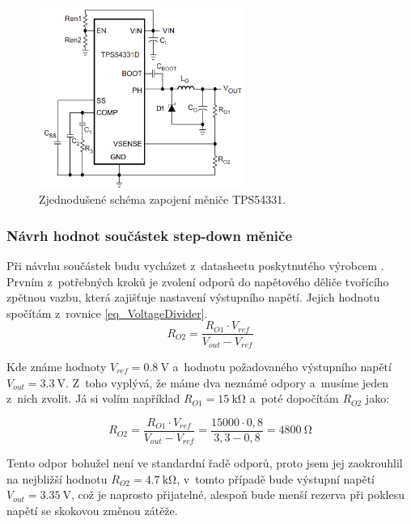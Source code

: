 \begin{figure}
    \centering
    \includegraphics[width=0.6\textwidth]{obrazky/schematicTPS54331.png}
    \caption{Zjednodušené schéma zapojení měniče TPS54331.\cite{dat_TPS54331}}
    \label{fig_Schematic-TPS54331}
\end{figure}

\subsubsection{Návrh hodnot součástek step-down měniče}

Při návrhu součástek budu vycházet z~datasheetu poskytnutého výrobcem \cite{dat_TPS54331}. Prvním z~potřebných kroků je zvolení odporů do napětového děliče tvořícího zpětnou vazbu, která zajišťuje nastavení výstupního napětí. Jejich hodnotu spočítám z~rovnice \ref{eq_VoltageDivider}.
\begin{equation}
    R_{O2}=\frac{R_{O1}\cdot V_{ref}}{V_{out}-V_{ref}}
    \label{eq_VoltageDivider}
\end{equation}

Kde známe hodnoty $V_{ref} = \SI{0,8}{\volt}$ a~hodnotu požadovaného výstupního napětí $V_{out} = \SI{3,3}{\volt}$. Z~toho vyplývá, že máme dva neznámé odpory a~musíme jeden z~nich zvolit. Já si volím například $R_{O1}=\SI{15}{\kilo\ohm}$ a~poté dopočítám $R_{O2}$ jako:

\begin{equation}
    R_{O2}=\frac{R_{O1}\cdot V_{ref}}{V_{out}-V_{ref}}=\frac{15000\cdot 0,8}{3,3-0,8}=\SI{4800}{\ohm}
    \label{eq_VoltageDivider-full}
\end{equation}

Tento odpor bohužel není ve standardní řadě odporů, proto jsem jej zaokrouhlil na nejbližší hodnotu $R_{O2}=\SI{4,7}{\kilo\ohm}$, v~tomto případě bude výstupní napětí $V_{out}=\SI{3,35}{\volt}$, což je naprosto přijatelné, alespoň bude menší rezerva při poklesu napětí se skokovou změnou zátěže.

